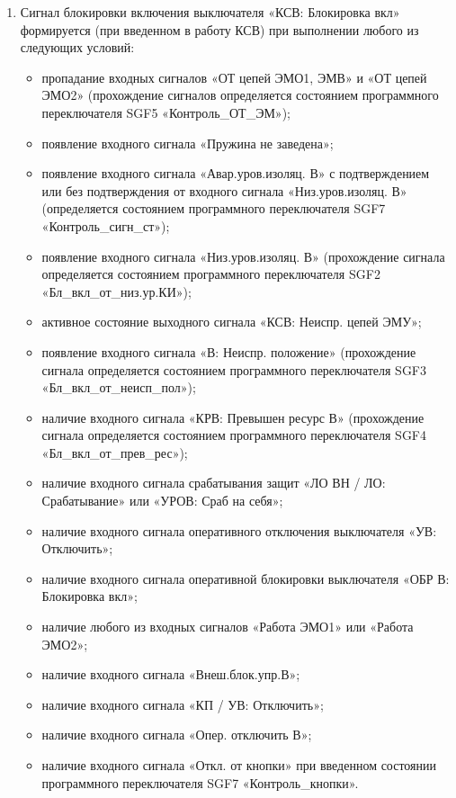 \begin{enumerate}
\item
Сигнал блокировки включения выключателя «КСВ: Блокировка вкл» формируется (при введенном в работу КСВ) при выполнении любого из следующих условий:
\begin{itemize}
\sloppy
\item пропадание входных сигналов «ОТ цепей ЭМО1, ЭМВ» и «ОТ цепей ЭМО2» (прохождение сигналов определяется состоянием программного переключателя SGF5 «Контроль\_ОТ\_ЭМ»);
\item появление входного сигнала «Пружина не заведена»;
\item появление входного сигнала «Авар.уров.изоляц. В» с подтверждением или без подтверждения от входного сигнала «Низ.уров.изоляц. В» (определяется состоянием программного переключателя SGF7 «Контроль\_сигн\_ст»);
\item появление входного сигнала «Низ.уров.изоляц. В» (прохождение сигнала определяется состоянием программного переключателя SGF2 «Бл\_вкл\_от\_низ.ур.КИ»);
\item активное состояние выходного сигнала «КСВ: Неиспр. цепей ЭМУ»;
\item появление входного сигнала «В: Неиспр. положение» (прохождение сигнала определяется состоянием программного переключателя SGF3 «Бл\_вкл\_от\_неисп\_пол»);
\item наличие входного сигнала «КРВ: Превышен ресурс В» (прохождение сигнала определяется состоянием программного переключателя SGF4 «Бл\_вкл\_от\_прев\_рес»);
\item наличие входного сигнала срабатывания защит «ЛО ВН / ЛО: Срабатывание» или «УРОВ: Сраб на себя»;
\item наличие входного сигнала оперативного отключения выключателя «УВ: Отключить»;
\item наличие входного сигнала оперативной блокировки выключателя «ОБР В: Блокировка вкл»; %
\item наличие любого из входных сигналов «Работа ЭМО1» или «Работа ЭМО2»;
\item наличие входного сигнала «Внеш.блок.упр.В»;
\item наличие входного сигнала «КП / УВ: Отключить»;
\item наличие входного сигнала «Опер. отключить В»;
\item наличие входного сигнала «Откл. от кнопки» при введенном состоянии программного переключателя SGF7 «Контроль\_кнопки».
\end{itemize}


\end{enumerate}
